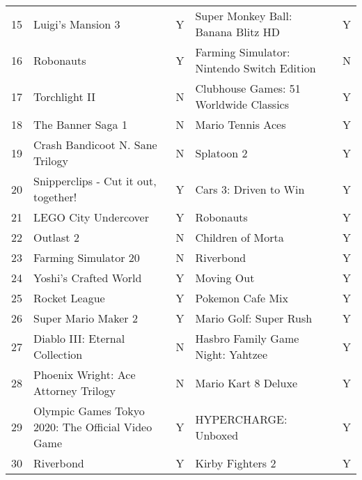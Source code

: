 \begin{tabular}{rllll}
   15 &                                 Luigi's Mansion 3 &         Y &                 Super Monkey Ball: Banana Blitz HD &         Y \\
   16 &                                         Robonauts &         Y &         Farming Simulator: Nintendo Switch Edition &         N \\
   17 &                                     Torchlight II &         N &             Clubhouse Games: 51 Worldwide Classics &         Y \\
   18 &                                 The Banner Saga 1 &         N &                                  Mario Tennis Aces &         Y \\
   19 &                   Crash Bandicoot N. Sane Trilogy &         N &                                         Splatoon 2 &         Y \\
   20 &              Snipperclips - Cut it out, together! &         Y &                              Cars 3: Driven to Win &         Y \\
   21 &                              LEGO City Undercover &         Y &                                          Robonauts &         Y \\
   22 &                                         Outlast 2 &         N &                                  Children of Morta &         Y \\
   23 &                              Farming Simulator 20 &         N &                                          Riverbond &         Y \\
   24 &                             Yoshi's Crafted World &         Y &                                         Moving Out &         Y \\
   25 &                                     Rocket League &         Y &                                   Pokemon Cafe Mix &         Y \\
   26 &                               Super Mario Maker 2 &         Y &                             Mario Golf: Super Rush &         Y \\
   27 &                    Diablo III: Eternal Collection &         N &                  Hasbro Family Game Night: Yahtzee &         Y \\
   28 &              Phoenix Wright: Ace Attorney Trilogy &         N &                                Mario Kart 8 Deluxe &         Y \\
   29 & Olympic Games Tokyo 2020: The Official Video Game &         Y &                               HYPERCHARGE: Unboxed &         Y \\
   30 &                                         Riverbond &         Y &                                   Kirby Fighters 2 &         Y \\
\bottomrule
\end{tabular}
